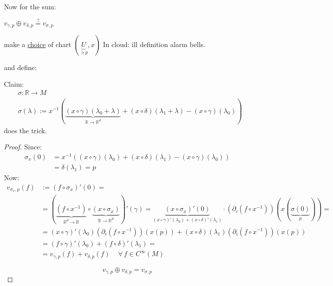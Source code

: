 \documentclass[10pt, twoside]{amsart}
\begin{document}
\begin{multicols*}{2}
Now for the sum: %

$v_{\gamma,p} \oplus v_{\delta,p} \overset{?}{=} v_{\sigma, p} $

make a \underline{choice} of chart $(\underbrace{U}_{\ni p} , x)$  In cloud: ill definition alarm bells. 

and define:

Claim:
\[
\begin{aligned}
  & \sigma : \mathbb{R} \to M \\
  & \sigma(\lambda) := x^{-1}( \underbrace{ (x\circ \gamma)(\lambda_0 + \lambda)}_{\mathbb{R} \to \mathbb{R}^d}  + (x\circ \delta)(\lambda_1+ \lambda) - (x\circ \gamma)(\lambda_0) )
\end{aligned}
\]
does the trick.
\begin{proof}
Since: 
\[
\begin{aligned}
  \sigma_x(0) & = x^{-1}((x\circ \gamma)(\lambda_0) + (x\circ \delta)(\lambda_1) - (x\circ \gamma)(\lambda_0)) \\
  & = \delta(\lambda_1) = p \end{aligned}
\]
Now:
\[
\begin{aligned}
  v_{\sigma_x,p}(f) & := (f\circ \sigma_x)'(0) =  \\ 
  & = ( \underbrace{ (f\circ x^{-1}) }_{\mathbb{R}^d \to \mathbb{R}}  \circ \underbrace{ (x\circ \sigma_x) }_{\mathbb{R} \to \mathbb{R}^d}  )'(\gamma) = \underbrace{ (x\circ \sigma_x)'(0) }_{(x\circ \gamma)'(\lambda_0) + (x\circ \delta)'(\lambda_1) } \cdot \left( \partial_i (f\circ x^{-1}) \right)(x( \underbrace{ \sigma(0)}_{p} ) ) = \\
  & = (x\circ \gamma)'(\lambda_0)(\partial_i (f\circ x^{-1}) )(x(p)) + (x\circ \delta)(\lambda_1)(\partial_i (f\circ x^{-1})  )(x(p)) \\
  & = (f\circ \gamma)'(\lambda_0) + (f\circ \delta)'(\lambda_1) = \\
  & = v_{\gamma,p}(f) + v_{\delta,p}(f) \quad \, \forall \, f \in C^{\infty}(M)
\end{aligned}
\]

\[
\boxed{ v_{\gamma,p} \oplus v_{\delta,p} = v_{\sigma, p} }
\]
\end{proof}




\end{multicols*}
\end{document}
